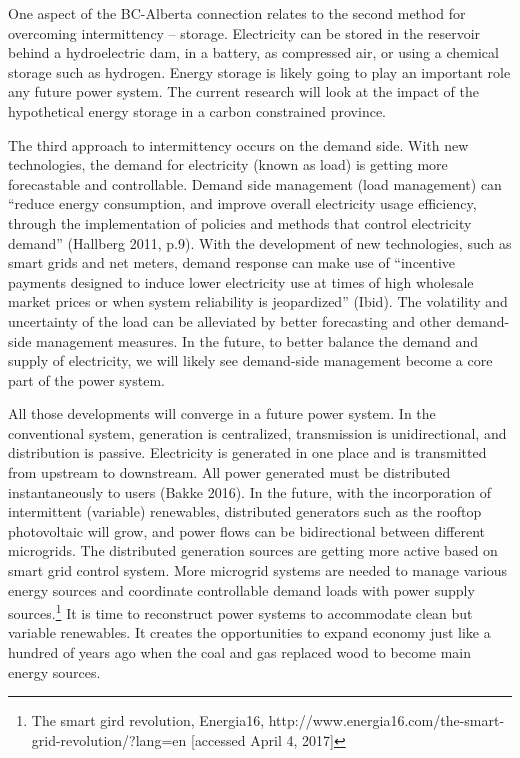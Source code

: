 \documentclass[10pt,letter]{article}
\begin{document}
One aspect of the BC-Alberta connection relates to the second method for
overcoming intermittency -- storage. Electricity can be stored in the
reservoir behind a hydroelectric dam, in a battery, as compressed air,
or using a chemical storage such as hydrogen. Energy storage is likely
going to play an important role any future power system. The current
research will look at the impact of the hypothetical energy storage in a
carbon constrained province.

The third approach to intermittency occurs on the demand side. With new
technologies, the demand for electricity (known as load) is getting more
forecastable and controllable. Demand side management (load management)
can ``reduce energy consumption, and improve overall electricity usage
efficiency, through the implementation of policies and methods that
control electricity demand'' (Hallberg 2011, p.9). With the development
of new technologies, such as smart grids and net meters, demand response
can make use of ``incentive payments designed to induce lower
electricity use at times of high wholesale market prices or when system
reliability is jeopardized'' (Ibid). The volatility and uncertainty of
the load can be alleviated by better forecasting and other demand-side
management measures. In the future, to better balance the demand and
supply of electricity, we will likely see demand-side management become
a core part of the power system.

All those developments will converge in a future power system. In the
conventional system, generation is centralized, transmission is
unidirectional, and distribution is passive. Electricity is generated in
one place and is transmitted from upstream to downstream. All power
generated must be distributed instantaneously to users (Bakke 2016). In
the future, with the incorporation of intermittent (variable)
renewables, distributed generators such as the rooftop photovoltaic will
grow, and power flows can be bidirectional between different microgrids.
The distributed generation sources are getting more active based on
smart grid control system. More microgrid systems are needed to manage
various energy sources and coordinate controllable demand loads with
power supply sources.\footnote{The smart gird revolution, Energia16,
  http://www.energia16.com/the-smart-grid-revolution/?lang=en
  {[}accessed April 4, 2017{]}} It is time to reconstruct power systems
to accommodate clean but variable renewables. It creates the
opportunities to expand economy just like a hundred of years ago when
the coal and gas replaced wood to become main energy sources.
\end{document}
